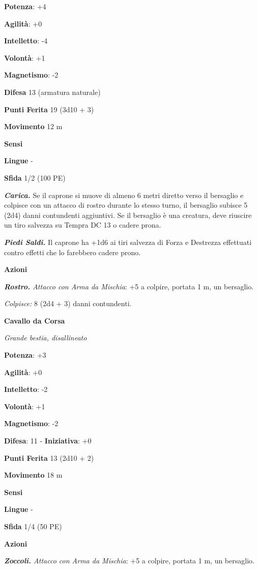 \begin{multicols}{2}
\textbf{Potenza}: +4

\textbf{Agilità}: +0

\textbf{Intelletto}: -4

\textbf{Volontà}: +1

\textbf{Magnetismo}: -2

\textbf{Difesa} 13 (armatura naturale)

\textbf{Punti Ferita} 19 (3d10 + 3)

\textbf{Movimento} 12 m

\textbf{Sensi} 

\textbf{Lingue} -

\textbf{Sfida} 1/2 (100 PE)\smallskip

\emph{\textbf{Carica.}} Se il caprone si muove di almeno 6 metri diretto
verso il bersaglio e colpisce con un attacco di rostro durante lo stesso
turno, il bersaglio subisce 5 (2d4) danni contundenti aggiuntivi. Se il
bersaglio è una creatura, deve riuscire un tiro salvezza su Tempra DC 13
o cadere prona.

\emph{\textbf{Piedi Saldi.}} Il caprone ha +1d6 ai tiri salvezza di
Forza e Destrezza effettuati contro effetti che lo farebbero cadere
prono.

\smallskip\textbf{Azioni}

\emph{\textbf{Rostro.} Attacco con Arma da Mischia}: +5 a colpire,
portata 1 m, un bersaglio.

\emph{Colpisce:} 8 (2d4 + 3) danni contundenti.

\textbf{Cavallo da Corsa}

\emph{Grande bestia, disallineato}

\textbf{Potenza}: +3

\textbf{Agilità}: +0

\textbf{Intelletto}: -2

\textbf{Volontà}: +1

\textbf{Magnetismo}: -2

\textbf{Difesa}: 11 - \textbf{Iniziativa}: +0

\textbf{Punti Ferita} 13 (2d10 + 2)

\textbf{Movimento} 18 m

\textbf{Sensi} 

\textbf{Lingue} -

\textbf{Sfida} 1/4 (50 PE)\smallskip

\smallskip\textbf{Azioni}

\emph{\textbf{Zoccoli.} Attacco con Arma da Mischia}: +5 a colpire,
portata 1 m, un bersaglio.


\end{multicols}
